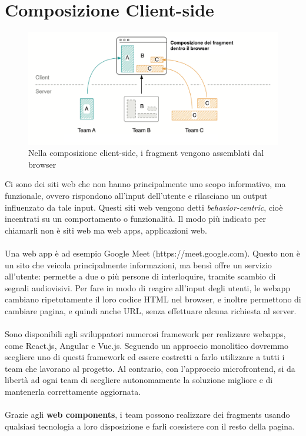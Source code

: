 \section{Composizione Client-side}
\begin{figure}[H]
    \centering
    \includegraphics[width=140mm]{img/clientside}
    \caption{Nella composizione client-side, i fragment vengono assemblati dal browser}
  \end{figure}
Ci sono dei siti web che non hanno principalmente uno scopo informativo, ma funzionale, ovvero rispondono all'input dell'utente
e rilasciano un output influenzato da tale input. Questi siti web vengono detti \emph{behavior-centric}, cioè 
incentrati su un comportamento o funzionalità.
Il modo più indicato per chiamarli non è siti web ma web apps, applicazioni web.
\\\\
Una web app è ad esempio Google Meet (https://meet.google.com).
Questo non è un sito che veicola principalmente informazioni, ma bensì offre un servizio all'utente: permette a due o più persone di 
interloquire, tramite scambio di segnali audiovisivi. Per fare in modo di reagire
all'input degli utenti, le webapp cambiano ripetutamente il loro codice HTML nel browser, e inoltre permettono 
di cambiare pagina, e quindi anche URL, senza effettuare alcuna richiesta al server.
\\\\
Sono disponibili agli sviluppatori numerosi framework per realizzare webapps, come React.js, Angular e Vue.js.
Seguendo un approccio monolitico dovremmo scegliere uno di questi framework ed essere costretti a farlo utilizzare
a tutti i team che lavorano al progetto. Al contrario, con l'approccio microfrontend, si da libertà ad ogni team
di scegliere autonomamente la soluzione migliore e di mantenerla correttamente aggiornata.
\\\\
Grazie agli \textbf{web components}, i team possono realizzare dei fragments usando qualsiasi tecnologia a loro disposizione e 
farli coesistere con il resto della pagina.



